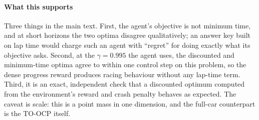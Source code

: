 \paragraph{What this supports} Three things in the main text. First, the agent's objective
is not minimum time, and at short horizons the two optima disagree qualitatively; an
answer key built on lap time would charge such an agent with ``regret'' for doing exactly
what its objective asks. Second, at the $\gamma = 0.995$ the agent uses, the discounted and
minimum-time optima agree to within one control step on this problem, so the dense
progress reward produces racing behaviour without any lap-time term. Third, it is an
exact, independent check that a discounted optimum computed from the environment's reward
and crash penalty behaves as expected. The caveat is scale: this is a point mass in one
dimension, and the full-car counterpart is the TO-OCP itself.
